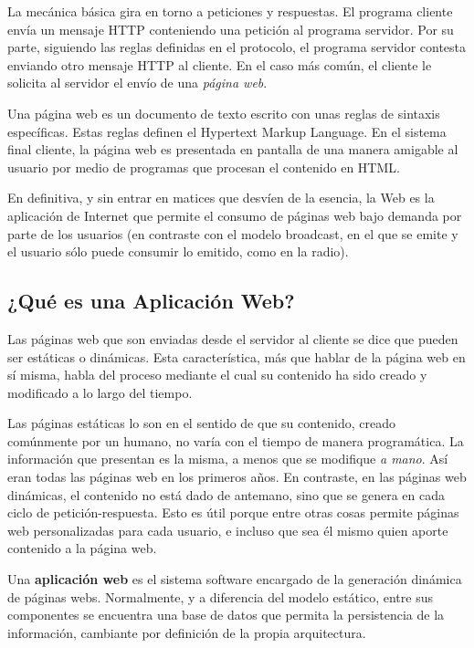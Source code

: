 \documentclass[a4paper,12pt,twoside,openright]{report}
\begin{document}
    La mecánica básica gira en torno a peticiones y respuestas. El programa cliente envía un mensaje HTTP conteniendo una petición al programa servidor. Por su parte, siguiendo las reglas definidas en el protocolo, el programa servidor contesta enviando otro mensaje HTTP al cliente. En el caso más común, el cliente le solicita al servidor el envío de una \emph{página web}.
    
    Una página web es un documento de texto escrito con unas reglas de sintaxis específicas. Estas reglas definen el Hypertext Markup Language. En el sistema final cliente, la página web es presentada en pantalla de una manera amigable al usuario por medio de programas que procesan el contenido en HTML.
    
    En definitiva, y sin entrar en matices que desvíen de la esencia, la Web es la aplicación de Internet que permite el consumo de páginas web bajo demanda por parte de los usuarios (en contraste con el modelo broadcast, en el que se emite y el usuario sólo puede consumir lo emitido, como en la radio).
    
    \subsection{¿Qué es una Aplicación Web?}
    Las páginas web que son enviadas desde el servidor al cliente se dice que pueden ser estáticas o dinámicas. Esta característica, más que hablar de la página web en sí misma, habla del proceso mediante el cual su contenido ha sido creado y modificado a lo largo del tiempo.
   	
   	Las páginas estáticas lo son en el sentido de que su contenido, creado comúnmente por un humano, no varía con el tiempo de manera programática. La información que presentan es la misma, a menos que se modifique \emph{a mano}. Así eran todas las páginas web en los primeros años. En contraste, en las páginas web dinámicas, el contenido no está dado de antemano, sino que se genera en cada ciclo de petición-respuesta. Esto es útil porque entre otras cosas permite páginas web personalizadas para cada usuario, e incluso que sea él mismo quien aporte contenido a la página web.
    
    Una \textbf{aplicación web} es el sistema software encargado de la generación dinámica de páginas webs. Normalmente, y a diferencia del modelo estático, entre sus componentes se encuentra una base de datos que permita la persistencia de la información, cambiante por definición de la propia arquitectura.
    
\end{document}
